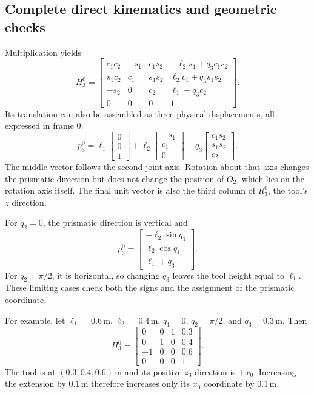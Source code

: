 \subsection{Complete direct kinematics and geometric checks}
Multiplication yields
\begin{equation}
 H_3^0=\begin{bmatrix}
 c_1c_2&-s_1&c_1s_2&-\ell_2s_1+q_3c_1s_2\\
 s_1c_2&c_1&s_1s_2&\ell_2c_1+q_3s_1s_2\\
 -s_2&0&c_2&\ell_1+q_3c_2\\
 0&0&0&1
 \end{bmatrix}.
 \label{eq:l10-dh-rrp}
\end{equation}
Its translation can also be assembled as three physical displacements,
all expressed in frame 0:
\begin{equation}
 p_3^0=
 \ell_1\begin{bmatrix}0\\0\\1\end{bmatrix}
 +\ell_2\begin{bmatrix}-s_1\\c_1\\0\end{bmatrix}
 +q_3\begin{bmatrix}c_1s_2\\s_1s_2\\c_2\end{bmatrix}.
 \label{eq:l10-dh-rrp-position}
\end{equation}
The middle vector follows the second joint axis. Rotation about that
axis changes the prismatic direction but does not change the position
of $O_2$, which lies on the rotation axis itself. The final unit vector
is also the third column of $R_3^0$, the tool's $z$ direction.

For $q_2=0$, the prismatic direction is vertical and
\[
 p_3^0=\begin{bmatrix}-\ell_2\sin q_1\\
 \ell_2\cos q_1\\\ell_1+q_3\end{bmatrix}.
\]
For $q_2=\pi/2$, it is horizontal, so changing $q_3$ leaves the tool
height equal to $\ell_1$. These limiting cases check both the signs and
the assignment of the prismatic coordinate.

For example, let $\ell_1=0.6\,\mathrm m$, $\ell_2=0.4\,\mathrm m$,
$q_1=0$, $q_2=\pi/2$, and $q_3=0.3\,\mathrm m$. Then
\[
 H_3^0=\begin{bmatrix}
 0&0&1&0.3\\0&1&0&0.4\\-1&0&0&0.6\\0&0&0&1
 \end{bmatrix}.
\]
The tool is at $(0.3,0.4,0.6)\,\mathrm m$ and its positive $z_3$
direction is $+x_0$. Increasing the extension by $0.1\,\mathrm m$
therefore increases only its $x_0$ coordinate by $0.1\,\mathrm m$.

